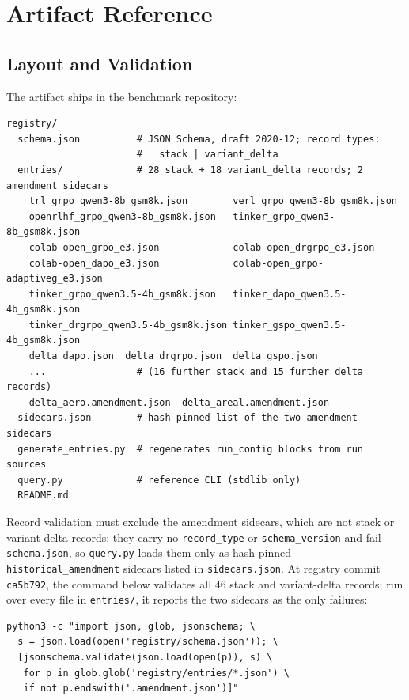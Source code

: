 \section{Artifact Reference}
\label{sec:p6-appendix}

\subsection{Layout and Validation}
\label{sec:p6-appendix-layout}
The artifact ships in the benchmark repository:

\begin{lstlisting}[basicstyle=\ttfamily\scriptsize, frame=single,
  caption={Artifact layout.}, label={lst:p6-layout}]
registry/
  schema.json          # JSON Schema, draft 2020-12; record types:
                       #   stack | variant_delta
  entries/             # 28 stack + 18 variant_delta records; 2 amendment sidecars
    trl_grpo_qwen3-8b_gsm8k.json        verl_grpo_qwen3-8b_gsm8k.json
    openrlhf_grpo_qwen3-8b_gsm8k.json   tinker_grpo_qwen3-8b_gsm8k.json
    colab-open_grpo_e3.json             colab-open_drgrpo_e3.json
    colab-open_dapo_e3.json             colab-open_grpo-adaptiveg_e3.json
    tinker_grpo_qwen3.5-4b_gsm8k.json   tinker_dapo_qwen3.5-4b_gsm8k.json
    tinker_drgrpo_qwen3.5-4b_gsm8k.json tinker_gspo_qwen3.5-4b_gsm8k.json
    delta_dapo.json  delta_drgrpo.json  delta_gspo.json
    ...                # (16 further stack and 15 further delta records)
    delta_aero.amendment.json  delta_areal.amendment.json
  sidecars.json        # hash-pinned list of the two amendment sidecars
  generate_entries.py  # regenerates run_config blocks from run sources
  query.py             # reference CLI (stdlib only)
  README.md
\end{lstlisting}

Record validation must exclude the amendment sidecars, which are not
stack or variant-delta records: they carry no \texttt{record\_type} or
\texttt{schema\_version} and fail \texttt{schema.json}, so \texttt{query.py}
loads them only as hash-pinned \texttt{historical\_amendment} sidecars listed in
\texttt{sidecars.json}. At registry commit \texttt{ca5b792}, the command below
validates all 46 stack and variant-delta records; run over every file in
\texttt{entries/}, it reports the two sidecars as the only failures:

\begin{lstlisting}[basicstyle=\ttfamily\scriptsize, frame=single]
python3 -c "import json, glob, jsonschema; \
  s = json.load(open('registry/schema.json')); \
  [jsonschema.validate(json.load(open(p)), s) \
   for p in glob.glob('registry/entries/*.json') \
   if not p.endswith('.amendment.json')]"
\end{lstlisting}

